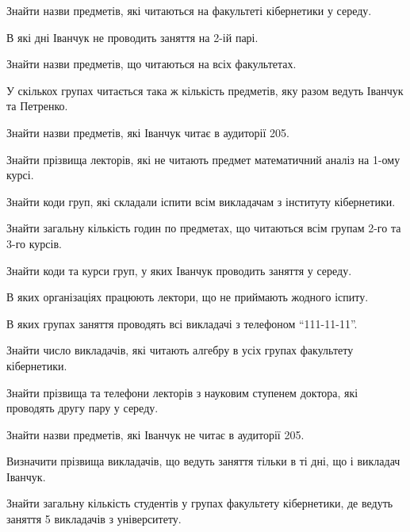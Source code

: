 \begin{card}
    \item Знайти назви предметів, які читаються на факультеті кібернетики у середу.
    \item В які дні Іванчук не проводить заняття на 2-ій парі.
    \item Знайти назви предметів, що читаються на всіх факультетах.
    \item У скількох групах читається така ж кількість предметів, яку разом ведуть Іванчук та Петренко.
\end{card}

\begin{card}
    \item Знайти назви предметів, які Іванчук читає в аудиторії 205.
    \item Знайти прізвища лекторів, які не читають предмет математичний аналіз на 1-ому курсі.
    \item Знайти коди груп, які складали іспити всім викладачам з інституту кібернетики.
    \item Знайти загальну кількість годин по предметах, що читаються всім групам 2-го та 3-го курсів.
\end{card}

\begin{card}
    \item Знайти коди та курси груп, у яких Іванчук проводить заняття у середу.
    \item В яких організаціях працюють лектори, що не приймають жодного іспиту.
    \item В яких групах заняття проводять всі викладачі з телефоном ``111-11-11''.
    \item Знайти число викладачів, які читають алгебру в усіх групах факультету кібернетики. 
\end{card}

\begin{card}
    \item Знайти прізвища та телефони лекторів з науковим ступенем доктора, які проводять другу пару у середу. 
    \item Знайти назви предметів, які Іванчук не читає в аудиторії 205.
    \item Визначити прізвища викладачів, що ведуть заняття  тільки в ті дні, що і викладач Іванчук.
    \item Знайти загальну кількість студентів у групах факультету кібернетики, де ведуть заняття 5 викладачів з університету.
\end{card}

